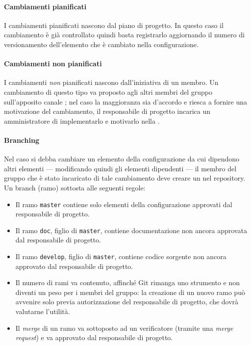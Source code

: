 \paragraph{Cambiamenti pianificati} I cambiamenti pianificati nascono dal piano di progetto. In questo caso il cambiamento è già controllato quindi basta registrarlo aggiornando il numero di versionamento dell'elemento che è cambiato nella configurazione.
\paragraph{Cambiamenti non pianificati} I cambiamenti \emph{non} pianificati nascono dall'iniziativa di un membro. Un cambiamento di questo tipo va proposto agli altri membri del gruppo sull'apposito canale ; nel caso la maggioranza sia d'accordo e riesca a fornire una motivazione del cambiamento, il responsabile di progetto incarica un amministratore di implementarlo e motivarlo nella .
\paragraph{Branching} Nel caso si debba cambiare un elemento della configurazione da cui dipendono altri elementi --- modificando quindi gli elementi dipendenti --- il membro del gruppo che è stato incaricato di tale cambiamento deve creare un  nel repository. Un branch (ramo) sottosta alle seguenti regole:
\begin{itemize}
	\item Il ramo \texttt{master} contiene solo elementi della configurazione approvati dal responsabile di progetto.
	\item Il ramo \texttt{doc}, figlio di \texttt{master}, contiene documentazione non ancora approvata dal responsabile di progetto.
	\item Il ramo \texttt{develop}, figlio di \texttt{master}, contiene codice sorgente non ancora approvato dal responsabile di progetto.
	\item Il numero di rami va contenuto, affinché Git rimanga uno strumento e non diventi un peso per i membri del gruppo: la creazione di un nuovo ramo può avvenire solo previa autorizzazione del responsabile di progetto, che dovrà valutarne l'utilità.
	\item Il \emph{merge} di un ramo va sottoposto ad un verificatore (tramite una \emph{merge request}) e va approvato dal responsabile di progetto.
\end{itemize}

